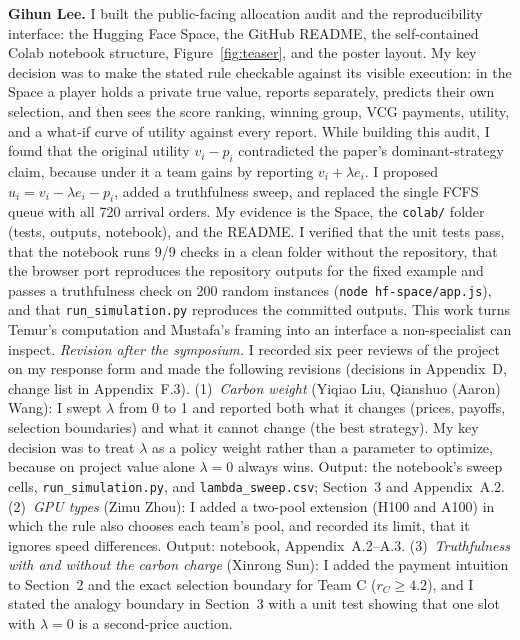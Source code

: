 \textbf{Gihun Lee.} I built the public-facing allocation audit and the reproducibility interface: the Hugging Face Space, the GitHub README, the self-contained Colab notebook structure, Figure~\ref{fig:teaser}, and the poster layout. My key decision was to make the stated rule checkable against its visible execution: in the Space a player holds a private true value, reports separately, predicts their own selection, and then sees the score ranking, winning group, VCG payments, utility, and a what-if curve of utility against every report. While building this audit, I found that the original utility $v_i-p_i$ contradicted the paper's dominant-strategy claim, because under it a team gains by reporting $v_i+\lambda e_i$. I proposed $u_i=v_i-\lambda e_i-p_i$, added a truthfulness sweep, and replaced the single FCFS queue with all 720 arrival orders. My evidence is the Space, the \texttt{colab/} folder (tests, outputs, notebook), and the README. I verified that the unit tests pass, that the notebook runs 9/9 checks in a clean folder without the repository, that the browser port reproduces the repository outputs for the fixed example and passes a truthfulness check on 200 random instances (\texttt{node hf-space/app.js}), and that \texttt{run\_simulation.py} reproduces the committed outputs. This work turns Temur's computation and Mustafa's framing into an interface a non-specialist can inspect. \emph{Revision after the symposium.} I recorded six peer reviews of the project on my response form and made the following revisions (decisions in Appendix~D, change list in Appendix~F.3).
(1)~\emph{Carbon weight} (Yiqiao Liu, Qianshuo (Aaron) Wang): I swept $\lambda$ from 0 to 1 and reported both what it changes (prices, payoffs, selection boundaries) and what it cannot change (the best strategy). My key decision was to treat $\lambda$ as a policy weight rather than a parameter to optimize, because on project value alone $\lambda=0$ always wins. Output: the notebook's sweep cells, \texttt{run\_simulation.py}, and \texttt{lambda\_sweep.csv}; Section~3 and Appendix~A.2.
(2)~\emph{GPU types} (Zimu Zhou): I added a two-pool extension (H100 and A100) in which the rule also chooses each team's pool, and recorded its limit, that it ignores speed differences. Output: notebook, Appendix~A.2--A.3.
(3)~\emph{Truthfulness with and without the carbon charge} (Xinrong Sun): I added the payment intuition to Section~2 and the exact selection boundary for Team C ($r_C\ge4.2$), and I stated the analogy boundary in Section~3 with a unit test showing that one slot with $\lambda=0$ is a second-price auction.

